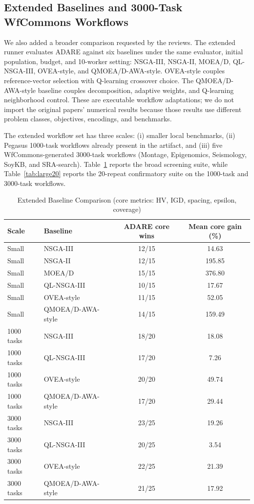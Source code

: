 \documentclass[runningheads]{llncs}
\begin{document}
\subsection{Extended Baselines and 3000-Task WfCommons Workflows}
We also added a broader comparison requested by the reviews. The extended runner evaluates ADARE against six baselines under the same evaluator, initial population, budget, and 10-worker setting: NSGA-III, NSGA-II, MOEA/D, QL-NSGA-III, OVEA-style, and QMOEA/D-AWA-style. OVEA-style couples reference-vector selection with Q-learning crossover choice. The QMOEA/D-AWA-style baseline couples decomposition, adaptive weights, and Q-learning neighborhood control. These are executable workflow adaptations; we do not import the original papers' numerical results because those results use different problem classes, objectives, encodings, and benchmarks.

The extended workflow set has three scales: (i) smaller local benchmarks, (ii) Pegasus 1000-task workflows already present in the artifact, and (iii) five WfCommons-generated 3000-task workflows (Montage, Epigenomics, Seismology, SoyKB, and SRA-search). Table~\ref{tab:extended_baselines} reports the broad screening suite, while Table~\ref{tab:large20} reports the 20-repeat confirmatory suite on the 1000-task and 3000-task workflows.

\begin{table}[H]
\caption{Extended Baseline Comparison (core metrics: HV, IGD, spacing, epsilon, coverage)}
\label{tab:extended_baselines}
\centering
\scriptsize
\begin{tabular}{@{}l l c c@{}}
\toprule
Scale & Baseline & ADARE core wins & Mean core gain (\%) \\
\midrule
Small & NSGA-III & 12/15 & 14.63 \\
Small & NSGA-II & 12/15 & 195.85 \\
Small & MOEA/D & 15/15 & 376.80 \\
Small & QL-NSGA-III & 10/15 & 17.67 \\
Small & OVEA-style & 11/15 & 52.05 \\
Small & QMOEA/D-AWA-style & 14/15 & 159.49 \\
\midrule
1000 tasks & NSGA-III & 18/20 & 18.08 \\
1000 tasks & QL-NSGA-III & 17/20 & 7.26 \\
1000 tasks & OVEA-style & 20/20 & 49.74 \\
1000 tasks & QMOEA/D-AWA-style & 17/20 & 29.44 \\
\midrule
3000 tasks & NSGA-III & 23/25 & 19.26 \\
3000 tasks & QL-NSGA-III & 20/25 & 3.54 \\
3000 tasks & OVEA-style & 22/25 & 21.39 \\
3000 tasks & QMOEA/D-AWA-style & 21/25 & 17.92 \\
\bottomrule
\end{tabular}
\end{table}
\end{document}
